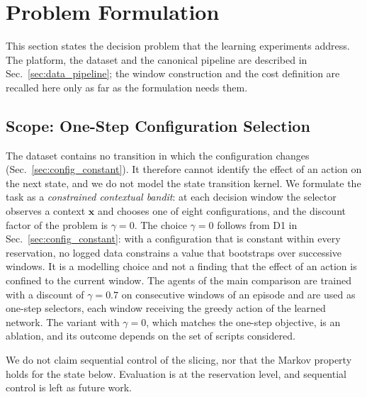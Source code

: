 \section{Problem Formulation}
\label{sec:formulation}

This section states the decision problem that the learning experiments address.%
The platform, the dataset and the canonical pipeline are described in Sec.~\ref{sec:data_pipeline}; the window construction and the cost definition are recalled here only as far as the formulation needs them.%

\subsection{Scope: One-Step Configuration Selection}
\label{sec:scope}

The dataset contains no transition in which the configuration changes (Sec.~\ref{sec:config_constant}).%
It therefore cannot identify the effect of an action on the next state, and we do not model the state transition kernel.%
We formulate the task as a \emph{constrained contextual bandit}: at each decision window the selector observes a context $\mathbf{x}$ and chooses one of eight configurations, and the discount factor of the problem is $\gamma=0$.%
The choice $\gamma=0$ follows from D1 in Sec.~\ref{sec:config_constant}: with a configuration that is constant within every reservation, no logged data constrains a value that bootstraps over successive windows.%
It is a modelling choice and not a finding that the effect of an action is confined to the current window.%
The agents of the main comparison are trained with a discount of $\gamma=0.7$ on consecutive windows of an episode and are used as one-step selectors, each window receiving the greedy action of the learned network.%
The variant with $\gamma=0$, which matches the one-step objective, is an ablation, and its outcome depends on the set of scripts considered.%

We do not claim sequential control of the slicing, nor that the Markov property holds for the state below.%
Evaluation is at the reservation level, and sequential control is left as future work.%

